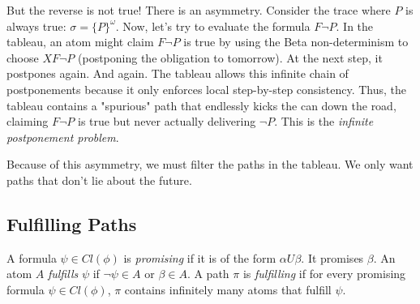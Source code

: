 But the reverse is not true! There is an asymmetry. Consider the trace where $P$ is always true: $\sigma = \{P\}^\omega$. Now, let's try to evaluate the formula $F \neg P$. In the tableau, an atom might claim $F \neg P$ is true by using the Beta non-determinism to choose $X F \neg P$ (postponing the obligation to tomorrow). At the next step, it postpones again. And again. The tableau allows this infinite chain of postponements because it only enforces local step-by-step consistency. Thus, the tableau contains a "spurious" path that endlessly kicks the can down the road, claiming $F \neg P$ is true but never actually delivering $\neg P$. This is the \emph{infinite postponement problem}.

Because of this asymmetry, we must filter the paths in the tableau. We only want paths that don't lie about the future.

\subsection{Fulfilling Paths}

\begin{definition}
A formula $\psi \in Cl(\phi)$ is \emph{promising} if it is of the form $\alpha U \beta$. It promises $\beta$.
An atom $A$ \emph{fulfills} $\psi$ if $\neg \psi \in A$ or $\beta \in A$.
A path $\pi$ is \emph{fulfilling} if for every promising formula $\psi \in Cl(\phi)$, $\pi$ contains infinitely many atoms that fulfill $\psi$.
\end{definition}

